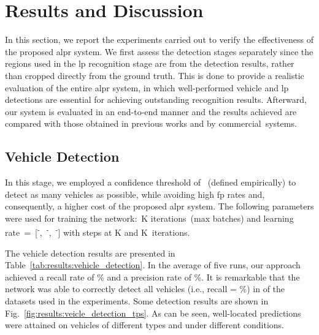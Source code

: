 \section{Results and Discussion}
\label{sec:results}

In this section, we report the experiments carried out to verify the effectiveness of the proposed \gls*{alpr} system.
We first assess the detection stages separately since the regions used in the \gls*{lp} recognition stage are from the detection results, rather than cropped directly from the ground truth.
This is done to provide a realistic evaluation of the entire \gls*{alpr} system, in which well-performed vehicle and \gls*{lp} detections are essential for achieving outstanding recognition results.
Afterward, our system is evaluated in an end-to-end manner and the results achieved are compared with those obtained in previous works and by commercial~systems.

\subsection{Vehicle Detection}
\label{sec:results:vehicle_detection}

In this stage, we employed a confidence threshold of~ (defined empirically) to detect as many vehicles as possible, while avoiding high \gls*{fp} rates and, consequently, a higher cost of the proposed \gls*{alpr} system.
The following parameters were used for training the network:~K iterations~(max batches) and learning rate~=~[\textsuperscript{-},~\textsuperscript{-},~\textsuperscript{-}] with steps at K and K~iterations.

The vehicle detection results are presented in Table~\ref{tab:results:vehicle_detection}.
In the average of five runs, our approach achieved a recall rate of \% and a precision rate of \%. 
It is remarkable that the network was able to correctly detect all vehicles (i.e., recall = \%) in  of the  datasets used in the experiments.
Some detection results are shown in Fig.~\ref{fig:results:veicle_detection_tps}. 
As can be seen, well-located predictions were attained on vehicles of different types and under different conditions.

